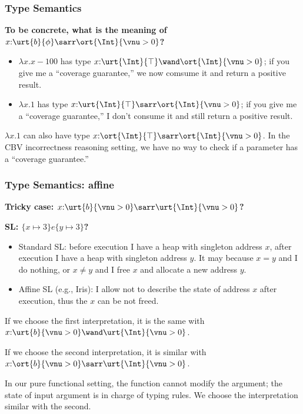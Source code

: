 \begin{frame}
    \frametitle{Type Semantics}

\textbf{To be concrete, what is the meaning of $x{:}\urt{b}{\phi}\sarr\ort{\Int}{\vnu > 0}$?}

\begin{itemize}
    \item $\lambda x. x - 100$ has type $x{:}\urt{\Int}{\top}\wand\ort{\Int}{\vnu > 0}$; if you give me a ``coverage guarantee,'' we now comsume it and return a positive result.
    \item $\lambda x. 1$ has type $x{:}\urt{\Int}{\top}\sarr\ort{\Int}{\vnu > 0}$; if you give me a ``coverage guarantee,'' I don't consume it and still return a positive result.
\end{itemize}

$\lambda x. 1$ can also have type $x{:}\ort{\Int}{\top}\sarr\ort{\Int}{\vnu > 0}$. In the CBV incorrectness reasoning setting, we have no way to check if a parameter has a ``coverage guarantee.''
    
\end{frame}

\begin{frame}
    \frametitle{Type Semantics: affine}

\textbf{Tricky case: $x{:}\urt{b}{\vnu > 0}\sarr\urt{\Int}{\vnu > 0}$?}

\textbf{SL: $\{x \mapsto 3\} e \{y \mapsto 3\}$?}

\begin{itemize}
    \item Standard SL: before execution I have a heap with singleton address $x$, after execution I have a heap with singleton address $y$. It may because $x = y$ and I do nothing, or $x \neq y$ and I free $x$ and allocate a new address $y$.
    \item Affine SL (e.g., Iris): I allow not to describe the state of address $x$ after execution, thus the $x$ can be not freed.
\end{itemize}

If we choose the first interpretation, it is the same with $x{:}\urt{b}{\vnu > 0}\wand\urt{\Int}{\vnu > 0}$.

If we choose the second interpretation, it is similar with $x{:}\ort{b}{\vnu > 0}\sarr\urt{\Int}{\vnu > 0}$.

In our pure functional setting, the function cannot modify the argument; the state of input argument is in charge of typing rules. We choose the interpretation similar with the second.
    
\end{frame}

